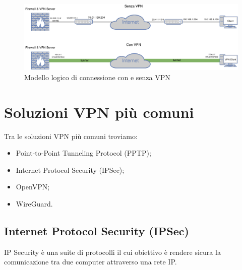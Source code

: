 \begin{figure}[ht]
    \centering
    \includegraphics[width=14cm]{figure/vpn_noVPN.pdf}
    \caption{Modello logico di connessione con e senza VPN}
\end{figure}

\section{Soluzioni VPN più comuni}

Tra le soluzioni VPN più comuni troviamo:
\begin{itemize}
    \item Point-to-Point Tunneling Protocol (PPTP);
    \item Internet Protocol Security (IPSec);
    \item OpenVPN;
    \item WireGuard.
\end{itemize}




\subsection{Internet Protocol Security (IPSec)}
IP Security è una suite di protocolli il cui obiettivo è rendere sicura la comunicazione tra due computer attraverso una rete IP.
